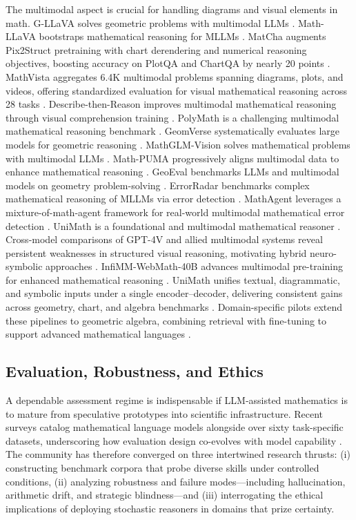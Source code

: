 \documentclass[acmsmall,anonymous]{acmart}
\begin{document}
The multimodal aspect is crucial for handling diagrams and visual elements in math. G-LLaVA solves geometric problems with multimodal LLMs \cite{gao2023}. Math-LLaVA bootstraps mathematical reasoning for MLLMs \cite{shi2024}. MatCha augments Pix2Struct pretraining with chart derendering and numerical reasoning objectives, boosting accuracy on PlotQA and ChartQA by nearly 20 points \cite{liu-2023-matcha}. MathVista aggregates 6.4K multimodal problems spanning diagrams, plots, and videos, offering standardized evaluation for visual mathematical reasoning across 28 tasks \cite{lu-2024-mathvista}. Describe-then-Reason improves multimodal mathematical reasoning through visual comprehension training \cite{jia2024}. PolyMath is a challenging multimodal mathematical reasoning benchmark \cite{gupta2024}. GeomVerse systematically evaluates large models for geometric reasoning \cite{kazemi2023}. MathGLM-Vision solves mathematical problems with multimodal LLMs \cite{yang2024b}. Math-PUMA progressively aligns multimodal data to enhance mathematical reasoning \cite{zhuang2024}. GeoEval benchmarks LLMs and multimodal models on geometry problem-solving \cite{zhang2024d}. ErrorRadar benchmarks complex mathematical reasoning of MLLMs via error detection \cite{yan2024a}. MathAgent leverages a mixture-of-math-agent framework for real-world multimodal mathematical error detection \cite{yan2025b}. UniMath is a foundational and multimodal mathematical reasoner \cite{liang2023a}.  Cross-model comparisons of GPT-4V and allied multimodal systems reveal persistent weaknesses in structured visual reasoning, motivating hybrid neuro-symbolic approaches \cite{singh2023assessinggpt4vstructuredreasoning}. InfiMM-WebMath-40B advances multimodal pre-training for enhanced mathematical reasoning \cite{han2024}.  UniMath unifies textual, diagrammatic, and symbolic inputs under a single encoder–decoder, delivering consistent gains across geometry, chart, and algebra benchmarks \cite{liang-2023-unimath}.  Domain-specific pilots extend these pipelines to geometric algebra, combining retrieval with fine-tuning to support advanced mathematical languages \cite{wang-2023-geometric-algebra}.

\subsection{Evaluation, Robustness, and Ethics}\label{sec:evaluation}
A dependable assessment regime is indispensable if LLM‐assisted mathematics is to mature from speculative prototypes into scientific infrastructure.  Recent surveys catalog mathematical language models alongside over sixty task-specific datasets, underscoring how evaluation design co-evolves with model capability \cite{liu-2025-math-lm-survey}.  The community has therefore converged on three intertwined research thrusts: (i) constructing benchmark corpora that probe diverse skills under controlled conditions, (ii) analyzing robustness and failure modes—including hallucination, arithmetic drift, and strategic blindness—and (iii) interrogating the ethical implications of deploying stochastic reasoners in domains that prize certainty.
\end{document}
